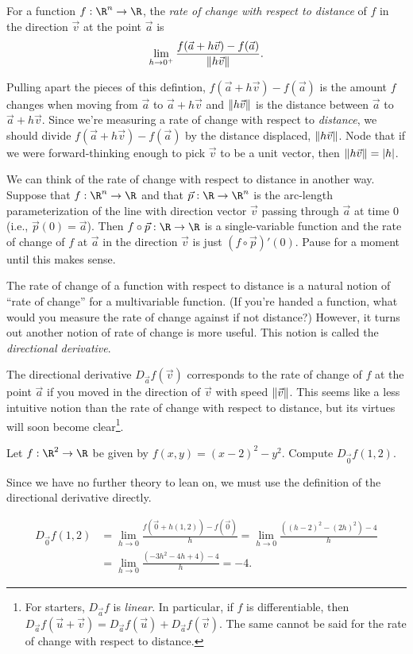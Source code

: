 \begin{definition}
	For a function $f:\R^n\to\R$, the \emph{rate of change with respect to distance} of $f$
	in the direction $\vec v$ at the point $\vec a$ is
	\[
		\lim_{h\to 0^+}\frac{f(\vec a+h\vec v)-f(\vec a)}{\lVert h\vec v\rVert}.
	\]
\end{definition}

Pulling apart the pieces of this defintion, $f(\vec a+h\vec v)-f(\vec a)$ is the amount $f$
changes when moving from $\vec a$ to $\vec a+h\vec v$ and $\lVert h\vec v\rVert$ is the distance between
$\vec a$ to $\vec a+h\vec v$.  Since we're measuring a rate of change with respect to \emph{distance},
we should divide $f(\vec a+h\vec v)-f(\vec a)$ by the distance displaced, $\lVert h\vec v\rVert$.  Node that if
we were forward-thinking
enough to pick $\vec v$ to be a unit vector, then $\lVert h\vec v\rVert=\lvert h\rvert$.

We can think of the rate of change with respect to distance in another way.  
Suppose that $f:\R^n\to \R$
and that $\vec p:\R\to\R^n$ is the arc-length parameterization of the line with direction
vector $\vec v$ passing through $\vec a$ at time $0$ (i.e., $\vec p(0)=\vec a$). 
Then $f\circ \vec p:\R\to\R$ is a single-variable
function and the rate of change of $f$ at $\vec a$ in the direction $\vec v$ is just $(f\circ\vec p)'(0)$.
Pause for a moment until this makes sense.

The rate of change of a function with respect to distance is a natural
notion of ``rate of change'' for a multivariable function.  (If you're handed a function, what
would you measure the rate of change against if not distance?)  However, it turns out 
another notion of rate of change is more useful.  This notion is called the 
\emph{directional derivative}.

\DefDirectionalDerivative

The directional derivative $D_{\vec a}f(\vec v)$ corresponds to the rate of change of $f$ at the point $\vec a$
if you moved in the direction of $\vec v$ with speed $\lVert\vec v\rVert$.  This seems 
like a less intuitive notion than the rate of change with respect to distance, but its virtues will
soon become clear\footnote{ For starters, $D_{\vec a}f$ is \emph{linear}.  In particular, if $f$ is differentiable,
then $D_{\vec a}f(\vec u+\vec v)=D_{\vec a}f(\vec u)+D_{\vec a}f(\vec v)$.  The same cannot
be said for the rate of change with respect to distance.}.

\begin{example}
	Let $f:\R^2\to\R$ be given by $f(x,y)=(x-2)^2-y^2$.  Compute $D_{\vec 0}f(1,2)$.

	Since we have no further theory to lean on, we must use the definition of the directional
	derivative directly.

	\begin{align*}
		D_{\vec 0}f(1,2) &= \lim_{h\to0}\frac{f(\vec 0+h(1,2))-f(\vec 0)}{h}
		=\lim_{h\to0}\frac{((h-2)^2-(2h)^2)-4}{h}\\
		&=\lim_{h\to0}\frac{(-3h^2-4h+4)-4}{h}=-4.
	\end{align*}
\end{example}

